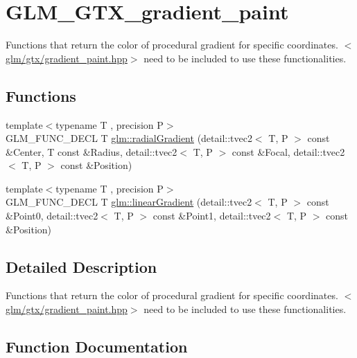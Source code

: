 \hypertarget{group__gtx__gradient__paint}{}\section{G\+L\+M\+\_\+\+G\+T\+X\+\_\+gradient\+\_\+paint}
\label{group__gtx__gradient__paint}


Functions that return the color of procedural gradient for specific coordinates. $<$\hyperlink{gradient__paint_8hpp}{glm/gtx/gradient\+\_\+paint.\+hpp}$>$ need to be included to use these functionalities.  


\subsection*{Functions}
\begin{DoxyCompactItemize}
\item 
{\footnotesize template$<$typename T , precision P$>$ }\\G\+L\+M\+\_\+\+F\+U\+N\+C\+\_\+\+D\+E\+CL T \hyperlink{group__gtx__gradient__paint_ga864c46234e363137b717119231f422f6}{glm\+::radial\+Gradient} (detail\+::tvec2$<$ T, P $>$ const \&Center, T const \&Radius, detail\+::tvec2$<$ T, P $>$ const \&Focal, detail\+::tvec2$<$ T, P $>$ const \&Position)
\item 
{\footnotesize template$<$typename T , precision P$>$ }\\G\+L\+M\+\_\+\+F\+U\+N\+C\+\_\+\+D\+E\+CL T \hyperlink{group__gtx__gradient__paint_ga01eb377864e98f86bd44378e1b86eb22}{glm\+::linear\+Gradient} (detail\+::tvec2$<$ T, P $>$ const \&Point0, detail\+::tvec2$<$ T, P $>$ const \&Point1, detail\+::tvec2$<$ T, P $>$ const \&Position)
\end{DoxyCompactItemize}


\subsection{Detailed Description}
Functions that return the color of procedural gradient for specific coordinates. $<$\hyperlink{gradient__paint_8hpp}{glm/gtx/gradient\+\_\+paint.\+hpp}$>$ need to be included to use these functionalities. 



\subsection{Function Documentation}
